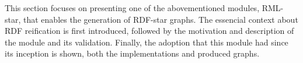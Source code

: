 This section focuses on presenting one of the abovementioned modules, RML-star, that enables the generation of RDF-star graphs. The essencial context about RDF reification is first introduced, followed by the motivation and description of the module and its validation. Finally, the adoption that this module had since its inception is shown, both the implementations and produced graphs. 










